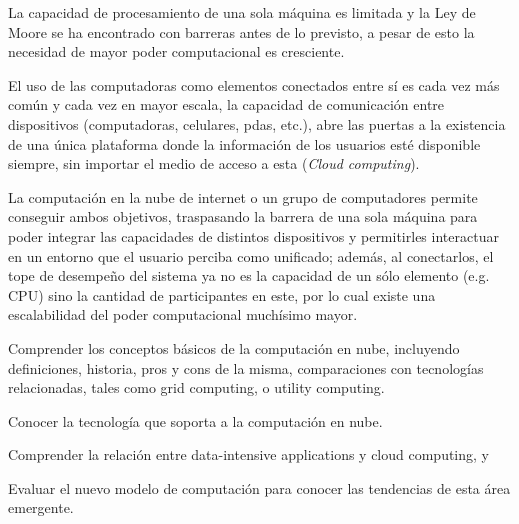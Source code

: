 \begin{syllabus}


\begin{justification}
La capacidad de procesamiento de una sola máquina es limitada y la Ley de Moore se ha encontrado 
con barreras antes de lo previsto, a pesar de esto la necesidad de mayor poder computacional es cresciente. 

El uso de las computadoras como elementos conectados entre sí es cada vez más común y cada vez en mayor escala, 
la capacidad de comunicación entre dispositivos (computadoras, celulares, pdas, etc.), abre las puertas 
a la existencia de una única plataforma donde la información de los usuarios
esté disponible siempre, sin importar el medio de acceso a esta (\textit{Cloud computing}).

La computación en la nube de internet o un grupo de computadores 
permite conseguir ambos objetivos, traspasando la barrera de una sola máquina para poder
integrar las capacidades de distintos dispositivos y permitirles interactuar en un entorno que
el usuario perciba como unificado; además, al conectarlos, el tope de desempeño
del sistema ya no es la capacidad de un sólo elemento (e.g. CPU) sino la cantidad de participantes en este,
por lo cual existe una escalabilidad del poder computacional muchísimo mayor.
\end{justification}

\begin{goals}
\item Comprender los conceptos básicos de la computación en nube, incluyendo definiciones, historia, pros y cons de la misma, comparaciones con tecnologías relacionadas, tales como grid computing, o utility computing.
\item Conocer la tecnología que soporta a la computación en nube.
\item Comprender la relación entre data-intensive applications y cloud computing, y
\item Evaluar el nuevo modelo de computación para conocer las tendencias de esta área emergente.
\end{goals}

\begin{outcomes}
\end{outcomes}


\end{syllabus}
